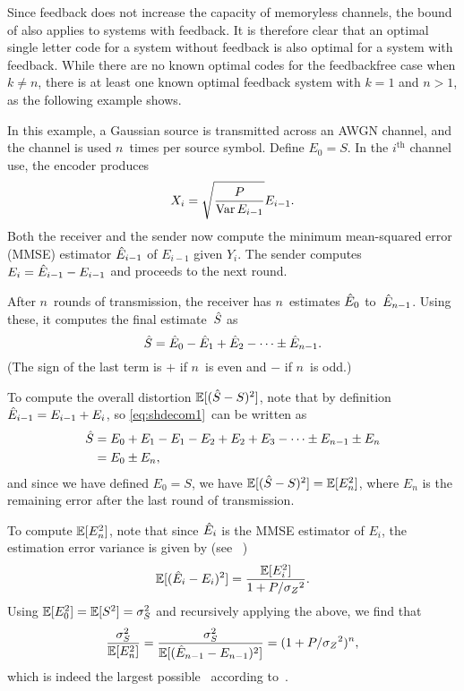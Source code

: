 Since feedback does not increase the capacity of memoryless channels, the bound
of  also applies to systems with feedback. It is therefore
clear that an optimal single letter code for a system without feedback is also
optimal for a system with feedback. While there are no known optimal codes for
the feedbackfree case when $k \ne n$, there is at least one known optimal
feedback system with $k = 1$ and $n > 1$, as the following example shows.

\begin{example}
  \label{ex:gaussfb}
  In this example, a Gaussian source is transmitted across an AWGN channel, and
  the channel is used $n$~times per source symbol.  Define $E_0 = S$. In the
  $i^{\text{th}}$ channel use, the encoder produces
  \begin{equation}
    \label{eq:gaussfbxi}
    X_i = \sqrt{\frac{P}{\operatorname{Var} E_{i-1}}} E_{i-1}.
  \end{equation}
  Both the receiver and the sender now compute the minimum mean-squared
  error (MMSE) estimator $\hat{E}_{i-1}$ of $E_{i-1}$ given $Y_i$. The sender
  computes $E_i = \hat{E}_{i-1} - E_{i-1}$ and proceeds to the next round.

  After $n$~rounds of transmission, the receiver has $n$~estimates $\hat{E}_0$
  to~$\hat{E}_{n-1}$. Using these, it computes the final estimate~${\hat{S}}$ as
  \begin{equation}
    \label{eq:shdecom1}
    {\hat{S}} = \hat{E}_0 - \hat{E}_1 + \hat{E}_2 - \cdots \pm \hat{E}_{n-1}.
  \end{equation}
  (The sign of the last term is $+$ if $n$~is even and $-$ if $n$~is odd.)

  To compute the overall distortion ${\mathbb{E}[({\hat{S}} - S)^2]}$, note that by definition $\hat{E}_{i-1} =
  E_{i-1} + E_i$, so \eqref{eq:shdecom1}~can be written as
  \begin{align*}
    {\hat{S}} &= E_0 + E_1 - E_1 - E_2 + E_2 + E_3 - \cdots \pm E_{n-1} \pm E_n \\
    &= E_0 \pm E_n,
  \end{align*}
  and since we have defined $E_0 = S$, we have ${\mathbb{E}[({\hat{S}} - S)^2]} = \mathbb{E}[E_n^2]$, where $E_n$
  is the remaining error after the last round of transmission.

  To compute $\mathbb{E}[E_n^2]$, note that since $\hat{E}_i$ is the MMSE estimator of
  $E_i$, the estimation error variance is given by (see
  \eg~\cite[Section~8.3]{Scharf1990})
  \begin{equation}
    \label{eq:gaussvardec}
    \mathbb{E}[(\hat{E}_i - E_i)^2] = \frac{\mathbb{E}[E_i^2]}{1 + P/{{\sigma_Z}^2}}.
  \end{equation}
  Using $\mathbb{E}[E_0^2] = \mathbb{E}[S^2] = {\sigma_S^2}$ and recursively applying the above, we find
  that
  \begin{equation*}
    \frac{{\sigma_S^2}}{\mathbb{E}[E_n^2]} = \frac{{\sigma_S^2}}{\mathbb{E}[(\hat{E}_{n-1} - E_{n-1})^2]} =
    (1 + P/{{\sigma_Z}^2})^n,
  \end{equation*}
  which is indeed the largest possible \sdr\ according
  to~.
\end{example}

